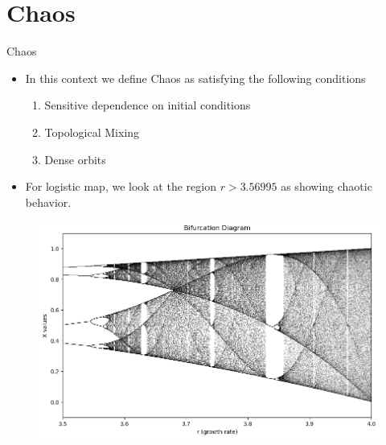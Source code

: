\documentclass[
	11pt, %
]{beamer}
\begin{document}
\section{Chaos}
\begin{frame}{Chaos}
    \begin{itemize}
        \item In this context we define Chaos as satisfying the following conditions
        \begin{enumerate}
            \item Sensitive dependence on initial conditions
            \item Topological Mixing
            \item Dense orbits
        \end{enumerate}
        \item For logistic map, we look at the region $r>3.56995$ as showing chaotic behavior.
        \end{itemize}
        \begin{figure}
	\includegraphics[scale=0.3]{./figures/chaosregion}
	\end{figure}
\end{frame}
\end{document}

